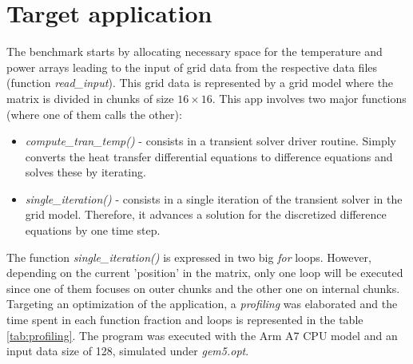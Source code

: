 \documentclass[conference]{IEEEtran}
\begin{document}
\section{Target application}
The benchmark starts by allocating necessary space for the temperature and power arrays leading to the input of grid data from the respective data files (function \textit{read\_input}). This grid data is represented by a grid model where the matrix is divided in chunks of size $16\times16$. This app involves two major functions (where one of them calls the other):
\begin{itemize}
    \item \textit{compute\_tran\_temp()} - consists in a transient solver driver routine. Simply converts the heat transfer differential equations to difference equations and solves these by iterating.
    
    \item \textit{single\_iteration()} - consists in a single iteration of the transient solver in the grid model. Therefore, it advances a solution for the discretized difference equations by one time step.
\end{itemize}

The function \textit{single\_iteration()} is expressed in two big \textit{for} loops. However, depending on the current 'position' in the matrix, only one loop will be executed since one of them focuses on outer chunks and the other one on internal chunks. Targeting an optimization of the application, a \textit{profiling} was elaborated and the time spent in each function fraction and loops is represented in the table \ref{tab:profiling}. The program was executed with the Arm A7 CPU model and an input data size of 128, simulated under \textit{gem5.opt}.
\end{document}
